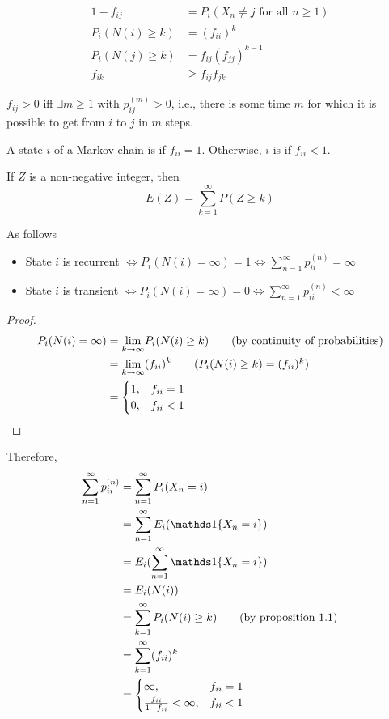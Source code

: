 \documentclass[11pt]{article}
\newcommand{\dur}[3]{{#1}_{#2}^{({#3})}}
\renewcommand{\limit}[1]{\underset{{#1} \rightarrow \infty}{\lim}}
\begin{document}
    \fact
    \begin{align}
    	1 - f_{ij} &= P_i(X_n \neq j \text{ for all } n \geq 1) \\
    	P_i(N(i) \geq k) &= (f_{ii})^k \\
    	P_i(N(j) \geq k) &= f_{ij}(f_{jj})^{k-1} \\
    	f_{ik} &\geq f_{ij}f_{jk}
    \end{align}
    
    \fact
    $f_{ij} > 0$ iff $\exists m \geq 1$ with $\dur{p}{ij}{m} > 0$, i.e., there is some time $m$ for which it is possible to get from $i$ to $j$ in $m$ steps.
    
    A state $i$ of a Markov chain is  if $f_{ii} = 1$. Otherwise, $i$ is  if $f_{ii} < 1$.
    
    \proposition
    If $Z$ is a non-negative integer, then
    $$E(Z) = \sum_{k=1}^\infty P(Z \geq k)$$
    
     As follows
    \begin{itemize}
    	\item  State $i$ is recurrent $\iff P_i(N(i) = \infty) = 1 \iff \sum_{n=1}^\infty p_{ii}^{(n)} = \infty$
    	\item State $i$ is transient $\iff P_i(N(i) = \infty) = 0 \iff \sum_{n=1}^\infty p_{ii}^{(n)} < \infty$ 
    \end{itemize}
    \begin{proof}
    	\begin{align*}
    		P_i(N(i) = \infty) &= \limit{k} P_i(N(i) \geq k) \tag{by continuity of probabilities} \\
    		&= \limit{k} (f_{ii})^k \tag{$P_i(N(i) \geq k) = (f_{ii})^k$}\\
    		&= \begin{cases}
    			1, & f_{ii} = 1 \\
    			0, & f_{ii} < 1
    		\end{cases}
    	\end{align*}
    \end{proof}
    Therefore,
    \begin{align*}
    	\sum_{n=1}^\infty \dur{p}{ii}{n} &= \sum_{n=1}^\infty P_i(X_n = i) \\ 
    	&= \sum_{n=1}^\infty E_i(\id{X_n = i}) \\
    	&= E_i(\sum_{n=1}^\infty \id{X_n = i}) \\
    	&= E_i(N(i)) \\
    	&= \sum_{k=1}^\infty P_i(N(i) \geq k) \tag{by proposition 1.1}\\
    	&= \sum_{k=1}^\infty (f_{ii})^k \\
    	&= \begin{cases}
    		\infty, & f_{ii} = 1\\
    		\frac{f_{ii}}{1 - f_{ii}} < \infty, & f_{ii} < 1
    	\end{cases}
    \end{align*}
    
\end{document}
